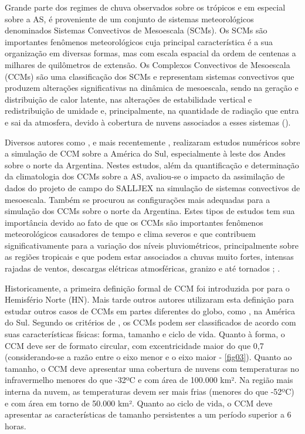 Grande parte dos regimes de chuva observados sobre os trópicos e em especial sobre a AS, é proveniente de um conjunto de sistemas meteorológicos denominados Sistemas Convectivos de Mesoescala (SCMs). Os SCMs são importantes fenômenos meteorológicos cuja principal característica é a sua organização em diversas formas, mas com escala espacial da ordem de centenas a milhares de quilômetros de extensão. Os Complexos Convectivos de Mesoescala (CCMs) são uma classificação dos SCMs e representam sistemas convectivos que produzem alterações significativas na dinâmica de mesoescala, sendo na geração e distribuição de calor latente, nas alterações de estabilidade vertical e redistribuição de umidade e, principalmente, na quantidade de radiação que entra e sai da atmosfera, devido à cobertura de nuvens associados a esses sistemas (\cite{velascofritsch87}).

Diversos autores como ,  e mais recentemente , realizaram estudos numéricos sobre a simulação de CCM sobre a América do Sul, especialmente à leste dos Andes sobre o norte da Argentina. Nestes estudos, além da quantificação e determinação da climatologia dos CCMs sobre a AS, avaliou-se o impacto da assimilação de dados do projeto de campo do SALLJEX na simulação de sistemas convectivos de mesoescala. Também  se procurou as configurações mais adequadas para a simulação dos CCMs sobre o norte da Argentina. Estes tipos de estudos tem sua importância devido ao fato de que os CCMs são importantes fenômenos meteorológicos causadores de tempo e clima severos e que contribuem significativamente para a variação dos níveis pluviométricos, principalmente sobre as regiões tropicais e que podem estar associados a chuvas muito fortes, intensas rajadas de ventos, descargas elétricas atmosféricas, granizo e até tornados \cite{maddox80}; \cite{menezessilvadias04}.

Historicamente, a primeira definição formal de CCM foi introduzida por  para o Hemisfério Norte (HN). Mais tarde outros autores utilizaram esta definição para estudar outros casos de CCMs em partes diferentes do globo, como , na América do Sul. Segundo os critérios de , os CCMs podem ser classificados de acordo com suas características físicas: forma, tamanho e ciclo de vida. Quanto à forma, o CCM deve ser de formato circular, com excentricidade maior do que 0,7 (considerando-se a razão entre o eixo menor e o eixo maior - \autoref{fig03}). Quanto ao tamanho, o CCM deve apresentar uma cobertura de nuvens com temperaturas no infravermelho menores do que -32ºC e com área de 100.000 km². Na região mais interna da nuvem, as temperaturas devem ser mais frias (menores do que -52ºC) e com área em torno de 50.000 km². Quanto ao ciclo de vida, o CCM deve apresentar as características de tamanho persistentes a um período superior a 6 horas.


